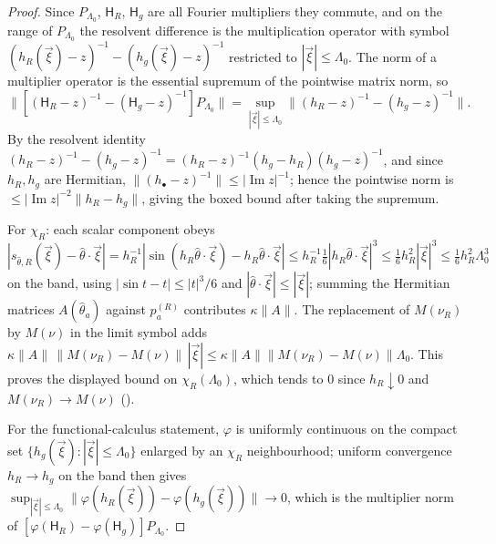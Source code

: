 \documentclass[11pt]{article}
\theoremstyle{definition}
\theoremstyle{remark}
\newcommand{\Ham}{\mathsf{H}}
\newcommand{\norm}[1]{\lVert#1\rVert}
\begin{document}
\begin{proof}
Since $P_{\Lambda_0}$, $\Ham_R$, $\Ham_g$ are all Fourier multipliers they
commute, and on the range of $P_{\Lambda_0}$ the resolvent difference is the
multiplication operator with symbol
$(h_R(\vec\xi)-z)^{-1}-(h_g(\vec\xi)-z)^{-1}$ restricted to
$|\vec\xi|\le\Lambda_0$.  The norm of a multiplier operator is the essential
supremum of the pointwise matrix norm, so
\[
  \bigl\lVert[(\Ham_R-z)^{-1}-(\Ham_g-z)^{-1}]P_{\Lambda_0}\bigr\rVert
  =\sup_{|\vec\xi|\le\Lambda_0}
   \bigl\lVert(h_R-z)^{-1}-(h_g-z)^{-1}\bigr\rVert .
\]
By the resolvent identity $(h_R-z)^{-1}-(h_g-z)^{-1}
=(h_R-z)^{-1}(h_g-h_R)(h_g-z)^{-1}$, and since $h_R,h_g$ are Hermitian,
$\norm{(h_\bullet-z)^{-1}}\le|\operatorname{Im}z|^{-1}$; hence the pointwise norm
is $\le|\operatorname{Im}z|^{-2}\norm{h_R-h_g}$, giving the boxed bound after
taking the supremum.

For $\chi_R$: each scalar component obeys $|s_{\hat\theta,R}(\vec\xi)
-\hat\theta\!\cdot\!\vec\xi|=h_R^{-1}|\sin(h_R\hat\theta\!\cdot\!\vec\xi)
-h_R\hat\theta\!\cdot\!\vec\xi|\le h_R^{-1}\tfrac16|h_R\hat\theta\!\cdot\!
\vec\xi|^{3}\le\tfrac16h_R^{2}|\vec\xi|^{3}\le\tfrac16h_R^2\Lambda_0^3$ on the
band, using $|\sin t-t|\le|t|^3/6$ and $|\hat\theta\!\cdot\!\vec\xi|\le|\vec\xi|$;
summing the Hermitian matrices $A(\hat\theta_a)$ against $p_a^{(R)}$ contributes
$\kappa\norm{A}$.  The replacement of $M(\nu_R)$ by $M(\nu)$ in the limit symbol
adds $\kappa\norm{A}\,\norm{M(\nu_R)-M(\nu)}\,|\vec\xi|\le\kappa\norm{A}
\norm{M(\nu_R)-M(\nu)}\Lambda_0$.  This proves the displayed bound on
$\chi_R(\Lambda_0)$, which tends to $0$ since $h_R\downarrow0$ and
$M(\nu_R)\to M(\nu)$ \textup{(}\textup{)}.

For the functional-calculus statement, $\varphi$ is uniformly continuous on the
compact set $\{h_g(\vec\xi):|\vec\xi|\le\Lambda_0\}$ enlarged by an $\chi_R$
neighbourhood; uniform convergence $h_R\to h_g$ on the band then gives
$\sup_{|\vec\xi|\le\Lambda_0}\norm{\varphi(h_R(\vec\xi))-\varphi(h_g(\vec\xi))}
\to0$, which is the multiplier norm of $[\varphi(\Ham_R)-\varphi(\Ham_g)]
P_{\Lambda_0}$.
\end{proof}
\end{document}
